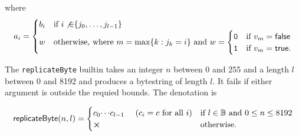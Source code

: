 \noindent where
$$
  a_i =
  \begin{cases}
    b_i & \text{if $i \not{\in} \{j_0, \ldots, j_{l-1}\}$}\\
    w & \text{otherwise, where $m = \max\{k : j_k = i\}$ and }
      w=\begin{cases}
      \mathtt{0} & \text{if $v_m = \mathsf{false}$}\\
      \mathtt{1} & \text{if $v_m = \mathsf{true}$}.
    \end{cases}
  \end{cases}
$$


\label{note:replicateByte}

The \texttt{replicateByte} builtin takes an integer $n$ between 0 and 255 and a
length $l$ between 0 and 8192 and produces a bytestring of length $l$.  It fails
if either argument is outside the requied bounds.  The denotation is

$$
\mathsf{replicateByte}(n,l) =
\begin{cases}
c_0{\cdots}c_{l-1} \quad\text{ ($c_i=c$ for all $i$}) & \text{if $l \in \B$ and $0 \leq n \leq 8192$}\\
\errorX      & \text{otherwise}.
\end{cases}
$$

